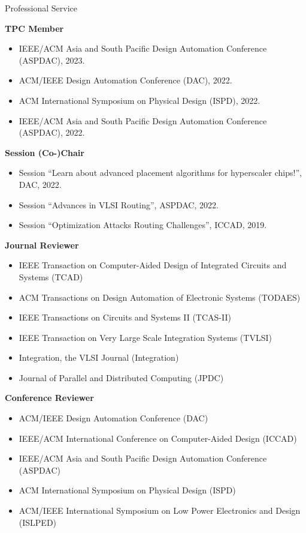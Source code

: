 
\begin{rSection}{Professional Service}

\textbf{TPC Member}
\begin{itemize}
    \item IEEE/ACM Asia and South Pacific Design Automation Conference (ASPDAC), 2023.
    \item ACM/IEEE Design Automation Conference (DAC), 2022.
    \item ACM International Symposium on Physical Design (ISPD), 2022.
    \item IEEE/ACM Asia and South Pacific Design Automation Conference (ASPDAC), 2022.
\end{itemize}

\textbf{Session (Co-)Chair}
\begin{itemize}
    \item Session ``Learn about advanced placement algorithms for hyperscaler chips!'', DAC, 2022.
    \item Session ``Advances in VLSI Routing'', ASPDAC, 2022.
    \item Session ``Optimization Attacks Routing Challenges'', ICCAD, 2019.
\end{itemize}

\textbf{Journal Reviewer}
\begin{itemize}
    \item IEEE Transaction on Computer-Aided Design of Integrated Circuits and Systems (TCAD)
    \item ACM Transactions on Design Automation of Electronic Systems (TODAES)
    \item IEEE Transactions on Circuits and Systems II (TCAS-II)
    \item IEEE Transaction on Very Large Scale Integration Systems (TVLSI)
    \item Integration, the VLSI Journal (Integration)
    \item Journal of Parallel and Distributed Computing (JPDC)
\end{itemize}

\textbf{Conference Reviewer}
\begin{itemize}
    \item ACM/IEEE Design Automation Conference (DAC)
    \item IEEE/ACM International Conference on Computer-Aided Design (ICCAD)
    \item IEEE/ACM Asia and South Pacific Design Automation Conference (ASPDAC)
    \item ACM International Symposium on Physical Design (ISPD)
    \item ACM/IEEE International Symposium on Low Power Electronics and Design (ISLPED)
\end{itemize}
\end{rSection}


